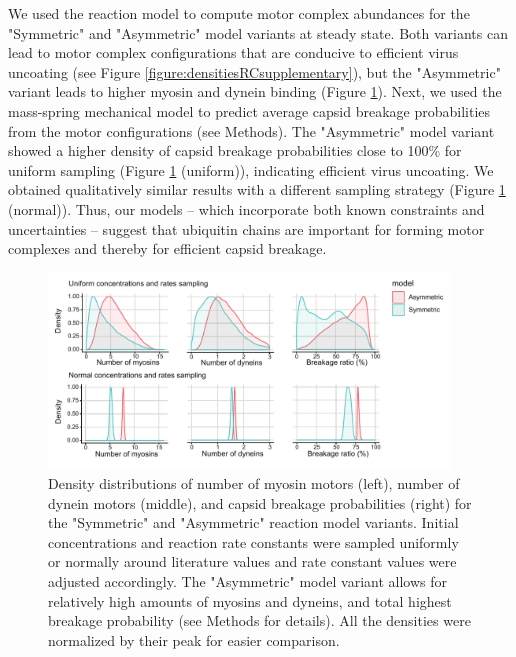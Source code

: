 We used the reaction model to compute motor complex abundances for the "Symmetric" and "Asymmetric" model variants at steady state. Both variants can lead to motor complex configurations that are conducive to efficient virus uncoating (see Figure \ref{figure:densitiesRCsupplementary}), but the "Asymmetric" variant leads to higher myosin and dynein binding (Figure \ref{figure:densitiesRC}). Next, we used the mass-spring mechanical model to predict average capsid breakage probabilities from the motor configurations (see Methods). The "Asymmetric" model variant showed a higher density of capsid breakage probabilities close to 100\% for uniform sampling (Figure \ref{figure:densitiesRC} (uniform)), indicating efficient virus uncoating. We obtained qualitatively similar results with a different sampling strategy (Figure \ref{figure:densitiesRC} (normal)). Thus, our models – which incorporate both known constraints and uncertainties – suggest that ubiquitin chains are important for forming motor complexes and thereby for efficient capsid breakage.

\begin{figure}
\begin{center}
\includegraphics[width=0.95\textwidth, trim={0cm 0cm 0cm 0cm}, clip]{D_chapters/2_ReactionModel/densitiesRC.pdf}
\caption[Molecular motor and capsid breakage density distributions based on joined sampling of rates and concentrations]%
{Density distributions of number of myosin motors (left), number of dynein motors (middle), and capsid breakage probabilities (right) for the "Symmetric" and "Asymmetric" reaction model variants. Initial concentrations and reaction rate constants were sampled uniformly or normally around literature values and rate constant values were adjusted accordingly. The "Asymmetric" model variant allows for relatively high amounts of myosins and dyneins, and total highest breakage probability (see Methods for details). All the densities were normalized by their peak for easier comparison.}
\label{figure:densitiesRC}
\end{center}
\end{figure}

